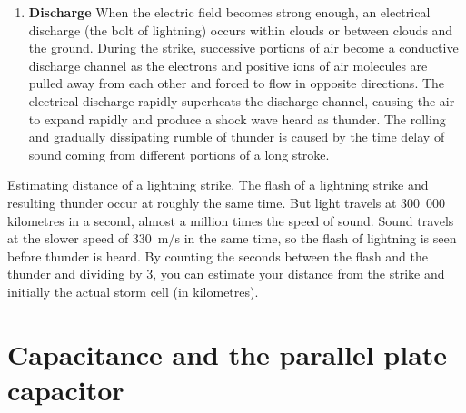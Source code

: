 {\begin {enumerate}
initial phase involves a relatively small electric current (tens or hundreds of
amperes), and the leader is almost invisible compared to the subsequent
lightning channel.
When a step leader approaches the ground, the presence of opposite charges on
the ground enhances the electric field. The electric field is highest on trees
and tall buildings. If the electric field is strong enough, a conductive
discharge (called a positive streamer) can develop from these points. As the
field increases, the positive streamer may evolve into a hotter, higher current
leader which eventually connects to the descending stepped leader from the
cloud. It is also possible for many streamers to develop from many different
objects at the same time, with only one connecting with the leader and forming the
main discharge path. Photographs have been taken on which non-connected
streamers are clearly visible. When the two leaders meet, the electric current
greatly increases. The region of high current propagates back up the positive
stepped leader into the cloud with a "return stroke" that is the most luminous
part of the lightning discharge.
\item \textbf{Discharge}
When the electric field becomes strong enough, an electrical discharge (the bolt
of lightning) occurs within clouds or between clouds and the ground. During the
strike, successive portions of air become a conductive discharge channel as the
electrons and positive ions of air molecules are pulled away from each other and
forced to flow in opposite directions.
The electrical discharge rapidly superheats the discharge channel, causing the
air to expand rapidly and produce a shock wave heard as thunder. The rolling and
gradually dissipating rumble of thunder is caused by the time delay of sound
coming from different portions of a long stroke.
\end{enumerate}}
Estimating distance of a lightning strike. The flash of a
lightning strike and resulting thunder occur at roughly the same
time. But light travels at 300~000 kilometres in a second, almost
a million times the speed of sound. Sound travels at the slower
speed of 330~m/s in the same time, so the flash of lightning is
seen before thunder is heard. By counting the seconds between the
flash and the thunder and dividing by 3, you can estimate your
distance from the strike and initially the actual storm cell (in
kilometres).
\nopagebreak
\section{Capacitance and the parallel plate capacitor}
\label{p:em:es11:c}

